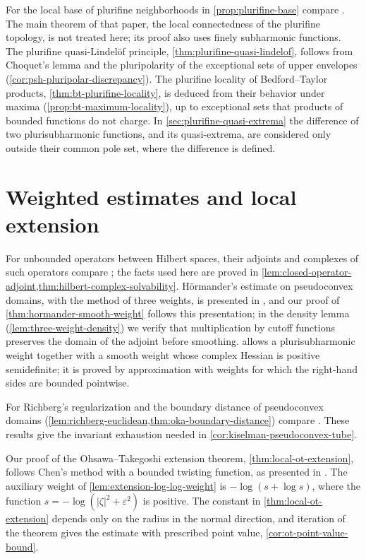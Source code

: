 For the local base of plurifine neighborhoods in \cref{prop:plurifine-base} compare \cite[Lemma 3.1]{EMW06}. The main theorem of that paper, the local connectedness of the plurifine topology, is not treated here; its proof also uses finely subharmonic functions. The plurifine quasi-Lindel\"of principle, \cref{thm:plurifine-quasi-lindelof}, follows from Choquet's lemma and the pluripolarity of the exceptional sets of upper envelopes (\cref{cor:psh-pluripolar-discrepancy}). The plurifine locality of Bedford--Taylor products, \cref{thm:bt-plurifine-locality}, is deduced from their behavior under maxima (\cref{prop:bt-maximum-locality}), up to exceptional sets that products of bounded functions do not charge. In \cref{sec:plurifine-quasi-extrema} the difference of two plurisubharmonic functions, and its quasi-extrema, are considered only outside their common pole set, where the difference is defined.

\section{Weighted estimates and local extension}
\label{sec:history-weighted-extension}
For unbounded operators between Hilbert spaces, their adjoints and complexes of such operators compare \cite[Chapter VIII, Section 1]{DemBook}; the facts used here are proved in \cref{lem:closed-operator-adjoint,thm:hilbert-complex-solvability}. H\"ormander's estimate on pseudoconvex domains, with the method of three weights, is presented in \cite[Lemma 7.2, Proposition 7.3 and Theorem 7.1]{Blo14SCV}, and our proof of \cref{thm:hormander-smooth-weight} follows this presentation; in the density lemma (\cref{lem:three-weight-density}) we verify that multiplication by cutoff functions preserves the domain of the adjoint before smoothing.  allows a plurisubharmonic weight together with a smooth weight whose complex Hessian is positive semidefinite; it is proved by approximation with weights for which the right-hand sides are bounded pointwise.

For Richberg's regularization and the boundary distance of pseudoconvex domains (\cref{lem:richberg-euclidean,thm:oka-boundary-distance}) compare \cite[Chapter I, (5.18)--(5.21), and (7.1)--(7.2)]{DemBook}. These results give the invariant exhaustion needed in \cref{cor:kiselman-pseudoconvex-tube}.

Our proof of the Ohsawa--Takegoshi extension theorem, \cref{thm:local-ot-extension}, follows Chen's method with a bounded twisting function, as presented in \cite[Theorems 9.1--9.3 and Lemma 9.4]{Blo14SCV}. The auxiliary weight of \cref{lem:extension-log-log-weight} is $-\log(s+\log s)$, where the function $s=-\log(|\zeta|^2+\varepsilon^2)$ is positive. The constant in \cref{thm:local-ot-extension} depends only on the radius in the normal direction, and iteration of the theorem gives the estimate with prescribed point value, \cref{cor:ot-point-value-bound}.

